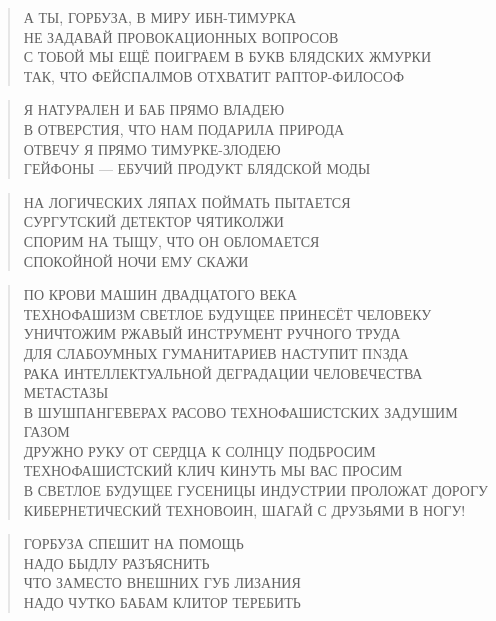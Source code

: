 \poemtitle{***}
\begin{verse}
А ТЫ, ГОРБУЗА, В МИРУ ИБН-ТИМУРКА\\
НЕ ЗАДАВАЙ ПРОВОКАЦИОННЫХ ВОПРОСОВ\\
С ТОБОЙ МЫ ЕЩЁ ПОИГРАЕМ В БУКВ БЛЯДСКИХ ЖМУРКИ\\
ТАК, ЧТО ФЕЙСПАЛМОВ ОТХВАТИТ РАПТОР-ФИЛОСОФ
\end{verse}

\poemtitle{***}
\begin{verse}
Я НАТУРАЛЕН И БАБ ПРЯМО ВЛАДЕЮ\\
В ОТВЕРСТИЯ, ЧТО НАМ ПОДАРИЛА ПРИРОДА\\
ОТВЕЧУ Я ПРЯМО ТИМУРКЕ-ЗЛОДЕЮ\\
ГЕЙФОНЫ — ЕБУЧИЙ ПРОДУКТ БЛЯДСКОЙ МОДЫ
\end{verse}

\poemtitle{***}
\begin{verse}
НА ЛОГИЧЕСКИХ ЛЯПАХ ПОЙМАТЬ ПЫТАЕТСЯ\\
СУРГУТСКИЙ ДЕТЕКТОР ЧЯТИКОЛЖИ\\
СПОРИМ НА ТЫЩУ, ЧТО ОН ОБЛОМАЕТСЯ\\
СПОКОЙНОЙ НОЧИ ЕМУ СКАЖИ
\end{verse}

\poemtitle{***}
\begin{verse}
ПО КРОВИ МАШИН ДВАДЦАТОГО ВЕКА\\
ТЕХНОФАШИЗМ СВЕТЛОЕ БУДУЩЕЕ ПРИНЕСЁТ ЧЕЛОВЕКУ\\
УНИЧТОЖИМ РЖАВЫЙ ИНСТРУМЕНТ РУЧНОГО ТРУДА\\
ДЛЯ СЛАБОУМНЫХ ГУМАНИТАРИЕВ НАСТУПИТ ПNЗДА\\
РАКА ИНТЕЛЛЕКТУАЛЬНОЙ ДЕГРАДАЦИИ ЧЕЛОВЕЧЕСТВА МЕТАСТАЗЫ\\
В ШУШПАНГЕВЕРАХ РАСОВО ТЕХНОФАШИСТСКИХ ЗАДУШИМ ГАЗОМ\\
ДРУЖНО РУКУ ОТ СЕРДЦА К СОЛНЦУ ПОДБРОСИМ\\
ТЕХНОФАШИСТСКИЙ КЛИЧ КИНУТЬ МЫ ВАС ПРОСИМ\\
В СВЕТЛОЕ БУДУЩЕЕ ГУСЕНИЦЫ ИНДУСТРИИ ПРОЛОЖАТ ДОРОГУ\\
КИБЕРНЕТИЧЕСКИЙ ТЕХНОВОИН, ШАГАЙ С ДРУЗЬЯМИ В НОГУ!
\end{verse}

\poemtitle{***}
\begin{verse}
ГОРБУЗА СПЕШИТ НА ПОМОЩЬ\\
НАДО БЫДЛУ РАЗЪЯСНИТЬ\\
ЧТО ЗАМЕСТО ВНЕШНИХ ГУБ ЛИЗАНИЯ\\
НАДО ЧУТКО БАБАМ КЛИТОР ТЕРЕБИТЬ
\end{verse}

